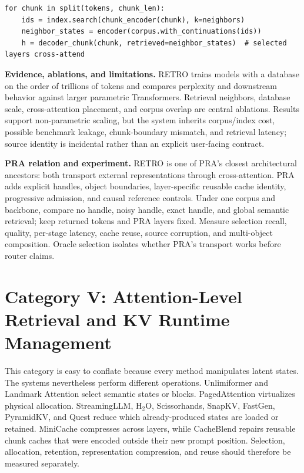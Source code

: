 \begin{lstlisting}[caption={RETRO-style chunk retrieval and cross-attention}]
for chunk in split(tokens, chunk_len):
    ids = index.search(chunk_encoder(chunk), k=neighbors)
    neighbor_states = encoder(corpus.with_continuations(ids))
    h = decoder_chunk(chunk, retrieved=neighbor_states)  # selected layers cross-attend
\end{lstlisting}

\textbf{Evidence, ablations, and limitations.} RETRO trains models with a database on the
order of trillions of tokens and compares perplexity and downstream behavior against larger
parametric Transformers.  Retrieval neighbors, database scale, cross-attention placement,
and corpus overlap are central ablations.  Results support non-parametric scaling, but the
system inherits corpus/index cost, possible benchmark leakage, chunk-boundary mismatch,
and retrieval latency; source identity is incidental rather than an explicit user-facing
contract.

\textbf{PRA relation and experiment.} RETRO is one of PRA's closest architectural ancestors:
both transport external representations through cross-attention.  PRA adds explicit handles,
object boundaries, layer-specific reusable cache identity, progressive admission, and causal
reference controls.  Under one corpus and backbone, compare no handle, noisy handle, exact
handle, and global semantic retrieval; keep returned tokens and PRA layers fixed.  Measure
selection recall, quality, per-stage latency, cache reuse, source corruption, and multi-object
composition.  Oracle selection isolates whether PRA's transport works before router claims.

\section{Category V: Attention-Level Retrieval and KV Runtime Management}

This category is easy to conflate because every method manipulates latent states. The
systems nevertheless perform different operations. Unlimiformer and Landmark Attention
select semantic states or blocks. PagedAttention virtualizes physical allocation.
StreamingLLM, H$_2$O, Scissorhands, SnapKV, FastGen, PyramidKV, and Quest reduce which
already-produced states are loaded or retained. MiniCache compresses across layers, while
CacheBlend repairs reusable chunk caches that were encoded outside their new prompt
position. Selection, allocation, retention, representation compression, and reuse should
therefore be measured separately.

